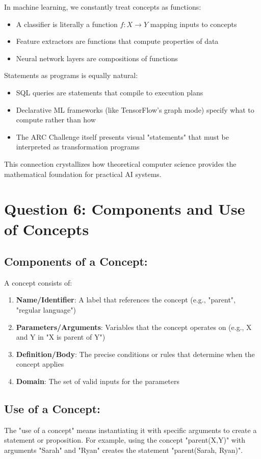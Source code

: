 \documentclass[12pt]{article}
\theoremstyle{definition}
\begin{document}
In machine learning, we constantly treat concepts as functions:
\begin{itemize}
    \item A classifier is literally a function $f: X \rightarrow Y$ mapping inputs to concepts
    \item Feature extractors are functions that compute properties of data
    \item Neural network layers are compositions of functions
\end{itemize}

Statements as programs is equally natural:
\begin{itemize}
    \item SQL queries are statements that compile to execution plans
    \item Declarative ML frameworks (like TensorFlow's graph mode) specify what to compute rather than how
    \item The ARC Challenge itself presents visual "statements" that must be interpreted as transformation programs
\end{itemize}

This connection crystallizes how theoretical computer science provides the mathematical foundation for practical AI systems.

\section*{Question 6: Components and Use of Concepts}
\subsection*{Components of a Concept:}
A concept consists of:
\begin{enumerate}
    \item \textbf{Name/Identifier}: A label that references the concept (e.g., "parent", "regular language")
    \item \textbf{Parameters/Arguments}: Variables that the concept operates on (e.g., X and Y in "X is parent of Y")
    \item \textbf{Definition/Body}: The precise conditions or rules that determine when the concept applies
    \item \textbf{Domain}: The set of valid inputs for the parameters
\end{enumerate}

\subsection*{Use of a Concept:}
The "use of a concept" means instantiating it with specific arguments to create a statement or proposition. For example, using the concept "parent(X,Y)" with arguments "Sarah" and "Ryan" creates the statement "parent(Sarah, Ryan)".
\end{document}
